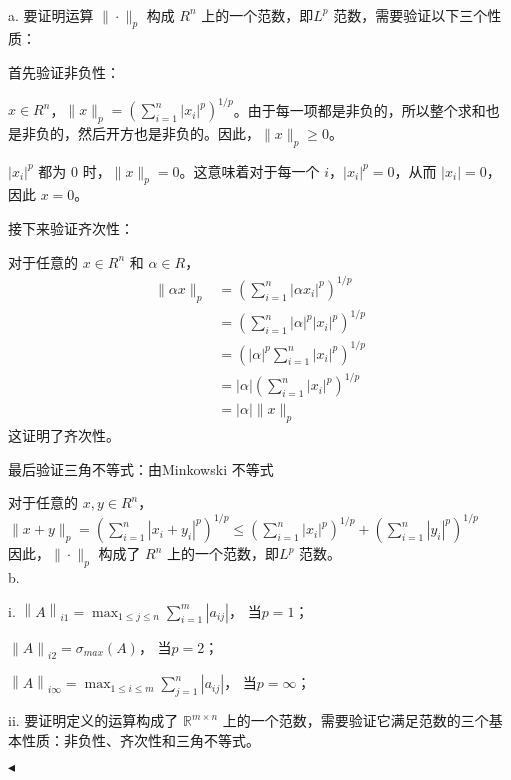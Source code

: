 \documentclass[11pt]{article}
\newenvironment{question}[2][Question]{\begin{trivlist}
\item[\hskip \labelsep {\bfseries #1}\hskip \labelsep {\bfseries #2.}]}{\hfill$\blacktriangleleft$\end{trivlist}}
\begin{document}
    \begin{question}{3 (11') (矩阵范数)}~
    
    a. 要证明运算 $\|\cdot\|_p$ 构成 $R^n$ 上的一个范数，即$L^p$ 范数，需要验证以下三个性质：
    
    首先验证非负性：
    
    \quad {} $x \in R^n$，$\|x\|_p = \left(\sum_{i=1}^{n} |x_i|^p\right)^{1/p}$。由于每一项都是非负的，所以整个求和也是非负的，然后开方也是非负的。因此，$\|x\|_p \geq 0$。
    
    \quad {} $|x_i|^p$ 都为 $0$ 时，$\|x\|_p = 0$。这意味着对于每一个 $i$，$|x_i|^p = 0$，从而 $|x_i| = 0$，因此 $x = 0$。
    
    接下来验证齐次性：
    
    对于任意的 $x \in R^n$ 和 $\alpha \in R$，
    \[\begin{split}\|\alpha x\|_p &= \left(\sum_{i=1}^{n} |\alpha x_i|^p\right)^{1/p} \\
    &= \left(\sum_{i=1}^{n} |\alpha|^p|x_i|^p\right)^{1/p} \\
    &= \left(|\alpha|^p \sum_{i=1}^{n} |x_i|^p\right)^{1/p} \\
    &= |\alpha| \left(\sum_{i=1}^{n} |x_i|^p\right)^{1/p} \\
    &= |\alpha| \|x\|_p\end{split}\]
    这证明了齐次性。
    
    最后验证三角不等式：由Minkowski 不等式

    对于任意的 $x, y \in R^n$，
    $\|x + y\|_p = (\sum_{i=1}^{n} {|x_i + y_i|}^p)^{1/p} \leq \left(\sum_{i=1}^{n} |x_i|^p\right)^{1/p} + \left(\sum_{i=1}^{n} |y_i|^p\right)^{1/p}$ \\
    因此，$\|\cdot\|_p$ 构成了 $R^n$ 上的一个范数，即$L^p$ 范数。\\
    
    b.

    \quad \quad i. $\left \| A \right \|_{i1} =\max_{1 \leq j\leq n} \sum_{i=1}^{m} \left | a_{ij} \right | $， 当$p=1$；

    \quad \quad \quad${\|A\|}_{i2} =\sigma_{max} (A)$， 当$p=2$；

    \quad \quad \quad$\left \| A \right \|_{i\infty } =\max_{1 \le i\le m} \sum_{j=1}^{n} \left | a_{ij} \right | $， 当$p=\infty$；

    \quad \quad ii. 要证明定义的运算构成了 \( \mathbb{R}^{m \times n} \) 上的一个范数，需要验证它满足范数的三个基本性质：非负性、齐次性和三角不等式。
    

\end{question}
\end{document}
